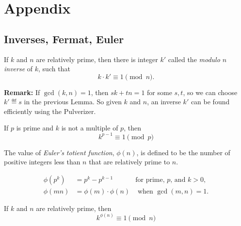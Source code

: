 \documentclass[handout]{mcs}
\begin{document}




\instatements{\newpage}

\section*{Appendix}

\subsection*{Inverses, Fermat, Euler}

\begin{lemma*}
If $k$ and $n$ are relatively prime, then there is integer
$k'$ called the \emph{modulo $n$ inverse} of $k$, such that
\[
k \cdot k' \equiv 1 \pmod n.
\]
\end{lemma*}

\textbf{Remark:} If $\gcd(k,n) =1$, then $sk+tn = 1$ for some $s,t$, so we
can choose $k' \eqdef s$ in the previous Lemma.  So given $k$ and $n$, an
inverse $k'$ can be found efficiently using the Pulverizer.

\begin{theorem*}
If $p$ is prime and $k$ is not a multiple of $p$, then
\[
k^{p-1} \equiv 1 \pmod{p}
\]
\end{theorem*}

\begin{definition*}
The value of \emph{Euler's totient function}, $\phi(n)$, is defined to be
the number of positive integers less than $n$ that are relatively prime to
$n$.
\end{definition*}

\begin{lemma*}
\begin{align*}
\phi(p^k)& = p^k - p^{k-1} & \text{for prime, $p$, and $k>0$},\\
\phi(mn) & = \phi(m)\cdot \phi(n) &\text{ when } \gcd(m,n)=1.
\end{align*}
\end{lemma*}

\begin{theorem*}
If $k$ and $n$ are relatively prime, then
\[
k^{\phi(n)} \equiv 1 \pmod{n}
\]
\end{theorem*}
\end{document}
